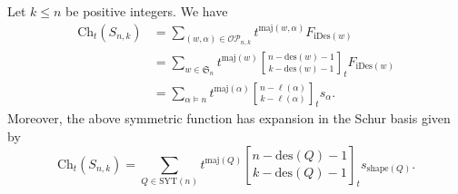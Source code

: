\documentclass[ALCO,ThmDefs,published]{cedram}
\newcommand{\symm}{{\mathfrak{S}}}
\theoremstyle{plain}
\newcommand{\maj}{{\mathrm {maj}}}
\newcommand{\des}{{\mathrm {des}}}
\newcommand{\SYT}{{\mathrm {SYT}}}
\newcommand{\Ch}{{\mathrm {Ch}}}
\newcommand{\iDes}{{\mathrm {iDes}}}
\newcommand{\shape}{{\mathrm {shape}}}
\newcommand{\symm}{{\mathfrak{S}}}
\newcommand{\OP}{{\mathcal{OP}}}
\begin{document}
\begin{corollary}
\label{s-characteristic-corollary}
Let $k \leq n$ be positive integers.  We have 
\begin{align}
\Ch_t(S_{n,k}) &= \sum_{(w,\alpha) \in \OP_{n,k}} t^{\maj(w,\alpha)} F_{\iDes(w)}  \\
&= \sum_{w \in \symm_n}  t^{\maj(w)} {n - \des(w) - 1 \brack k - \des(w) - 1}_t F_{\iDes(w)}  \\
&= \sum_{\alpha \models n} t^{\maj(\alpha)} {n - \ell(\alpha) \brack k - \ell(\alpha)}_t s_{\alpha}.
\end{align}
Moreover, the above symmetric function has expansion in the Schur basis given by
\begin{equation}
\label{schur-expansion-formula}
\Ch_t(S_{n,k}) = \sum_{Q \in \SYT(n)} t^{\maj(Q)} {n  - \des(Q) - 1 \brack k - \des(Q) - 1}_t s_{\shape(Q)}.
\end{equation}
\end{corollary}
\end{document}
